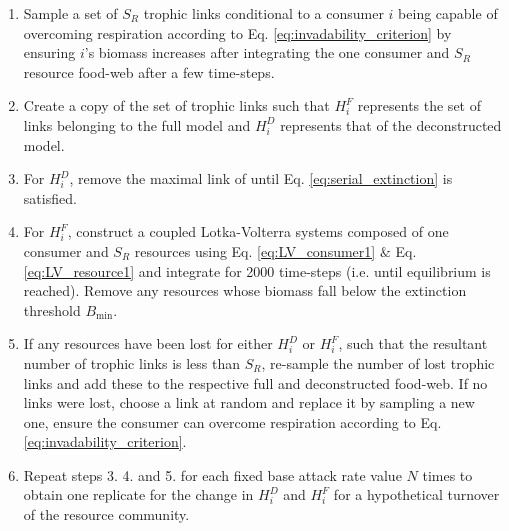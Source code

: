 \documentclass[a4paper]{report}
\begin{document}
\begin{enumerate}
\item Sample a set of $S_R$ trophic links conditional to a consumer $i$ being capable of overcoming respiration according to Eq. \eqref{eq:invadability_criterion} by ensuring $i$'s biomass increases after integrating the one consumer and $S_R$ resource food-web after a few time-steps.

\item Create a copy of the set of trophic links such that $H^F_i$ represents the set of links belonging to the full model and $H^D_i$ represents that of the deconstructed model.

\item For $H^D_i$, remove the maximal link of  until Eq. \eqref{eq:serial_extinction} is satisfied. 

\item For $H^F_i$, construct a coupled Lotka-Volterra systems composed of one consumer and $S_R$ resources using Eq. \eqref{eq:LV_consumer1} $\&$ Eq. \eqref{eq:LV_resource1} and integrate for 2000 time-steps (i.e. until equilibrium is reached). Remove any resources whose biomass fall below the extinction threshold $B_{\text{min}}$.

\item If any resources have been lost for either $H^D_i$ or $H^F_i$, such that the resultant number of trophic links is less than $S_R$, re-sample the number of lost trophic links and add these to the respective full and deconstructed food-web. If no links were lost, choose a link at random and replace it by sampling a new one, ensure the consumer can overcome respiration according to Eq. \eqref{eq:invadability_criterion}. 

\item Repeat steps 3. 4. and 5. for each fixed base attack rate value $N$ times to obtain one replicate for the change in $H^D_i$ and $H^F_i$ for a hypothetical turnover of the resource community.
\end{enumerate}
\end{document}
